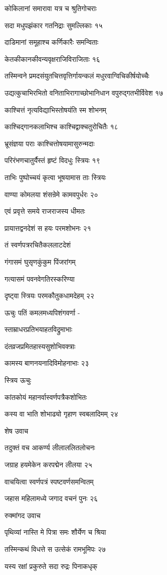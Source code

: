 कोकिलानां समारावा यत्र च श्रुतिगोचराः

सदा मधुपझंकार गतनिद्राः सुमल्लिकाः १५

दाडिमानां समूहाश्च कर्णिकारैः समन्विताः

केतकीकानकीवन्यवृक्षराजिविराजिताः १६

तस्मिन्वने प्रमदसंयुतचित्तवृत्तिर्गायन्कलं मधुरवाग्विचिकीर्षयोच्चैः

उद्यत्कुचाभिरभितो वनिताभिरागाच्छोभानिधान वपुरुद्गतभीर्विवेश १७

काश्चित्तं नृत्यविद्याभिस्तोषयंति स्म शोभनम्

काश्चिद्गानकलाभिश्च काश्चिद्वाक्चतुरोचितैः १८

भ्रूसंज्ञया पराः काश्चित्तोषयामासुरुन्मदाः

परिरंभणचातुर्यैस्तं हृष्टं विदधुः स्त्रियः १९

ताभिः पुष्पोच्चयं कृत्वा भूषयामास ताः स्त्रियः

वाण्या कोमलया शंसन्रेमे कामवपुर्धरः २०

एवं प्रवृत्ते समये राजराजस्य धीमतः

प्रायात्तद्वनदेशं स हयः परमशोभनः २१

तं स्वर्णपत्ररचितैकललाटदेशं

गंगासमं घुसृणकुंकुम पिंजरांगम्

गत्यासमं पवनवेगतिरस्करिण्या

दृष्ट्वा स्त्रियः परमकौतुकधामदेहम् २२

ऊचुः पतिं कमलमध्यपिशंगवर्णा -

स्ताम्राधरप्रतिभयाहतविद्रुमाभाः

दंतव्रजप्रमितहास्यसुशोभिवक्त्राः

कामस्य बाणनयनादिविमोहनाभाः २३

स्त्रिय ऊचुः

कांतकोयं महानर्वास्वर्णपत्रैकशोभितः

कस्य वा भाति शोभाढ्यो गृहाण स्वबलादिमम् २४

शेष उवाच

तदुक्तं वच आकर्ण्य लीलाललितलोचनः

जग्राह हयमेकेन करपद्मेन लीलया २५

वाचयित्वा स्वर्णपत्रं स्पष्टवर्णसमन्वितम्

जहास महिलामध्ये जगाद वचनं पुनः २६

रुक्मांगद उवाच

पृथिव्यां नास्ति मे पित्रा समः शौर्येण च श्रिया

तस्मिन्कथं विधत्ते स उत्सेकं रामभूमिपः २७

यस्य रक्षां प्रकुरुते सदा रुद्रः पिनाकधृक्

